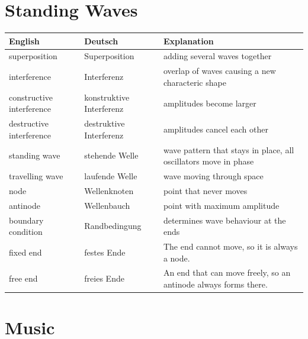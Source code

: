 \vspace{0.7cm}

\section*{Standing Waves}

\begin{tabular}{p{}p{}p{}}
\textbf{English} & \textbf{Deutsch} & \textbf{Explanation} \\ \hline
superposition & Superposition & adding several waves together \\
interference & Interferenz & overlap of waves causing a new characteric shape \\
constructive interference & konstruktive Interferenz & amplitudes become larger \\
destructive interference & destruktive Interferenz & amplitudes cancel each other \\
standing wave & stehende Welle & wave pattern that stays in place, all oscillators move in phase\\
travelling wave & laufende Welle & wave moving through space \\
node & Wellenknoten & point that never moves \\
antinode & Wellenbauch & point with maximum amplitude \\
boundary condition & Randbedingung & determines wave behaviour at the ends \\
fixed end & festes Ende & The end cannot move, so it is always a node.\\
free end & freies Ende & An end that can move freely, so an antinode always forms there. \\
\end{tabular}

\vspace{0.7cm}

\section*{Music}

